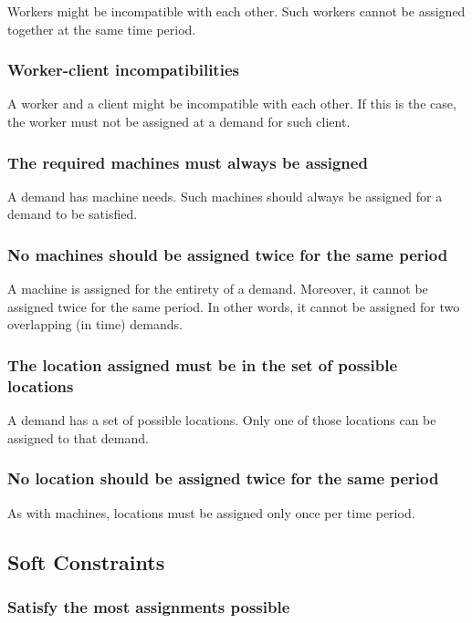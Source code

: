 \documentclass[../thesis.tex]{subfiles}
\begin{document}
Workers might be incompatible with each other. Such workers cannot
be assigned together at the same time period.

\subsubsection{Worker-client incompatibilities}

A worker and a client might be incompatible with each other. 
If this is the case, the worker must not be assigned at a demand for such client.

\subsubsection{The required machines must always be assigned}

A demand has machine needs. Such machines should always be assigned 
for a demand to be satisfied.

\subsubsection{No machines should be assigned twice for the same period}

A machine is assigned for the entirety of a demand. Moreover, it cannot be assigned twice 
for the same period. In other words, it cannot be assigned for two overlapping (in time) demands.


\subsubsection{The location assigned must be in the set of possible locations}

A demand has a set of possible locations. Only one of those locations can be assigned 
to that demand.

\subsubsection{No location should be assigned twice for the same period}

As with machines, locations must be assigned only once per time period.


\subsection{Soft Constraints}

\subsubsection{Satisfy the most assignments possible}
\end{document}
